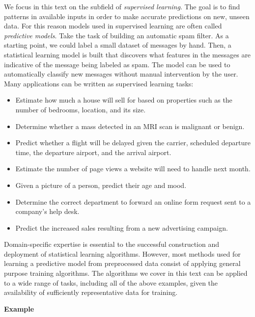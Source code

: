 \documentclass[12pt,hidelinks]{article}
\numberwithin{equation}{section}
\begin{document}
We focus in this text on the subfield of \textit{supervised learning}.
The goal is to find patterns in available
inputs in order to make accurate predictions on new, unseen data. For this
reason models used in supervised learning are often called \textit{predictive
models}. Take the task of building an automatic spam filter.
As a starting point, we could label a small dataset of messages by hand. Then,
a statistical learning model is built that discovers what features in the
messages are indicative of the message being labeled as spam. The model can
be used to automatically classify new messages without manual
intervention by the user. Many applications can be written as supervised
learning tasks:
\begin{itemize}
\item Estimate how much a house will sell for based on properties such as the
number of bedrooms, location, and its size.
\item Determine whether a mass detected in an MRI scan is malignant or benign.
\item Predict whether a flight will be delayed given the carrier, scheduled
departure time, the departure airport, and the arrival airport.
\item Estimate the number of page views a website will need to handle next
month.
\item Given a picture of a person, predict their age and mood.
\item Determine the correct department to forward an online form request sent
to a company's help desk.
\item Predict the increased sales resulting from a new advertising campaign.
\end{itemize}
Domain-specific expertise is essential to the successful construction and
deployment of statistical learning algorithms. However, most methods used for
learning a predictive model from preprocessed data consist of applying
general purpose training algorithms. The algorithms we cover in this text can
be applied to a wide range of tasks, including all of the above examples,
given the availability of sufficiently representative data for training.

\vspace{12pt}
\textbf{Example} \label{sec_slearn_intro}
\end{document}
